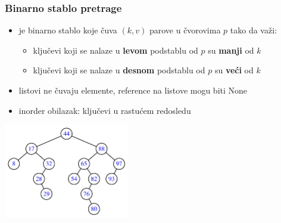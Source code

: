 \documentclass[compress,aspectratio=169]{beamer}
\begin{document}
\begin{frame}[fragile]
  \frametitle{Binarno stablo pretrage}
  \begin{itemize}
    \item {} je binarno stablo koje čuva $(k, v)$ parove u čvorovima $p$ tako da važi:
    \begin{itemize}
      \item ključevi koji se nalaze u \textbf{levom} podstablu od $p$ su \textbf{manji} od $k$
      \item ključevi koji se nalaze u \textbf{desnom} podstablu od $p$ su \textbf{veći} od $k$
    \end{itemize}
    \item listovi ne čuvaju elemente, reference na listove mogu biti None
    \item inorder obilazak: ključevi u rastućem redosledu 
  \end{itemize}
  \begin{center}
    \includegraphics[width=5.5cm]{asp-11-pic02.pdf}
  \end{center}
\end{frame}
\end{document}
